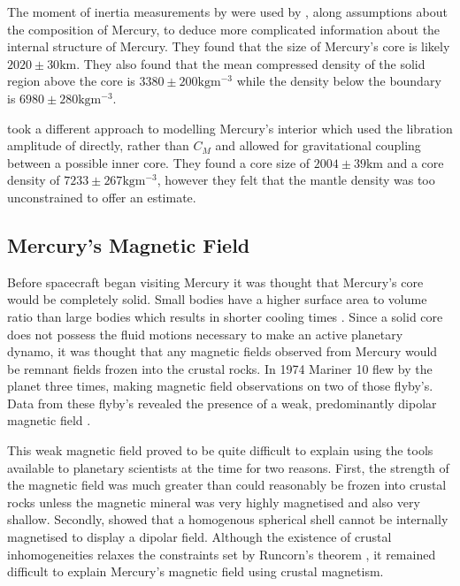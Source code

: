 The moment of inertia measurements by \citet{margot2012} were used by \citet{hauck2013}, along assumptions about the composition of Mercury, to deduce more complicated information about the internal structure of Mercury. They found that the size of Mercury's core is likely $2020 \pm 30\textrm{km}$. They also found that the mean compressed density of the solid region above the core is $3380\pm200 \textrm{kg} \textrm{m}^{-3}$ while the density below the boundary is $6980\pm280 \textrm{kg} \textrm{m}^{-3}$.

\citet{rivoldini2013} took a different approach to modelling Mercury's interior which used the libration amplitude of \citet{margot2012} directly, rather than $C_M$ and allowed for gravitational coupling between a possible inner core. They found a core size of $2004 \pm 39 \textrm{km}$ and a core density of  $7233\pm267 \textrm{kg} \textrm{m}^{-3}$, however they felt that the mantle density was too unconstrained to offer an estimate.

\subsection{Mercury's Magnetic Field} 
Before spacecraft began visiting Mercury it was thought that Mercury's core would be completely solid. Small bodies have a higher surface area to volume ratio than large bodies which results in shorter cooling times \citep{siegfried1974} . Since a solid core does not possess the fluid motions necessary to make an active planetary dynamo, it was thought that any magnetic fields observed from Mercury would be remnant fields frozen into the crustal rocks. In 1974 Mariner 10 flew by the planet three times, making magnetic field observations on two of those flyby's. Data from these flyby's revealed the presence of a weak, predominantly dipolar magnetic field \citep{nessmariner10}.

This weak magnetic field proved to be quite difficult to explain using the tools available to planetary scientists at the time for two reasons. First, the strength of the magnetic field was much greater than could reasonably be frozen into crustal rocks unless the magnetic mineral was very highly magnetised and also very shallow. Secondly, \citet{runcorn1976} showed that a homogenous spherical shell cannot be internally magnetised to display a dipolar field. Although the existence of crustal inhomogeneities relaxes the constraints set by Runcorn's theorem  \citep{Aharonson2004}, it remained difficult to explain Mercury's magnetic field using crustal magnetism.

